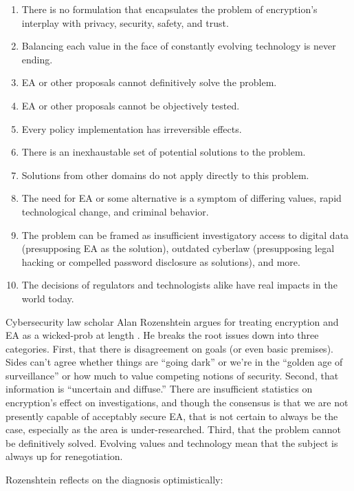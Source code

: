\begin{enumerate}
  \item There is no formulation that encapsulates the problem of encryption's interplay with privacy, security,
        safety, and trust.
  \item Balancing each value in the face of constantly evolving technology is never ending.
  \item \ac{EA} or other proposals cannot definitively solve the problem.
  \item \ac{EA} or other proposals cannot be objectively tested.
  \item Every policy implementation has irreversible effects.
  \item There is an inexhaustable set of potential solutions to the problem.
  \item Solutions from other domains do not apply directly to this problem.
  \item The need for \ac{EA} or some alternative is a symptom of differing values, rapid technological change, and
        criminal behavior.
  \item The problem can be framed as insufficient investigatory access to digital data (presupposing \ac{EA} as the
        solution), outdated cyberlaw (presupposing legal hacking or compelled password disclosure as solutions), and
        more.
  \item The decisions of regulators and technologists alike have real impacts in the world today.
\end{enumerate}

Cybersecurity law scholar Alan Rozenshtein argues for treating \ac{encryption} and \ac{EA} as a \ac{wicked-prob} at
length \cite{rozenshtein_wicked_2018}. He breaks the root issues down into three categories. First, that there is
disagreement on goals (or even basic premises). Sides can't agree whether things are ``going dark'' or we're in the
``golden age of surveillance'' or how much to value competing notions of security. Second, that information is
``uncertain and diffuse.'' There are insufficient statistics on encryption's effect on investigations, and though the
consensus is that we are not presently capable of acceptably secure \ac{EA}, that is not certain to always be the case,
especially as the area is under-researched. Third, that the problem cannot be definitively solved. Evolving values and
technology mean that the subject is always up for renegotiation.

Rozenshtein reflects on the diagnosis optimistically:

